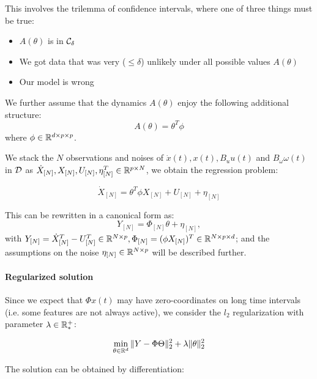 \documentclass{article}
\begin{document}
This involves the trilemma of confidence intervals, where one of three things must be true:
\begin{itemize}
    \item $A(\theta)$ is in $\mathcal{C}_\delta$
    \item We got data that was very ($\leq\delta$) unlikely under all possible values $A(\theta)$
    \item Our model is wrong
\end{itemize}

\begin{assumption}
\label{assum:linear_param}
We further assume that the dynamics $A(\theta)$ enjoy the following additional structure:
\begin{equation}
    A(\theta) = \theta^T \phi
\end{equation}
where $\phi\in \mathbb{R}^{d \times p \times p}$.
\end{assumption}

We stack the $N$ observations and noises of $\dot{x}(t), x(t), B_u u(t)$ and $B_\omega \omega(t)$ in $\mathcal{D}$ as $\dot{X}_{[N]}, X_{[N]}, U_{[N]}, \eta_{[N]}^T \in\mathbb{R}^{p\times N}$, we obtain the regression problem: 

\[\dot{X}_{[N]} = \theta^T\phi X_{[N]} + U_{[N]} + \eta_{[N]}\]

This can be rewritten in a canonical form as:
\begin{equation}
    \label{eq:regression}
    Y_{[N]} = \Phi_{[N]} \theta + \eta_{[N]},
\end{equation}
with $Y_{[N]} = \dot{X}_{[N]}^T - U_{[N]}^T  \in\mathbb{R}^{N\times p}, \Phi_{[N]} = (\phi X_{[N]})^T\in \mathbb{R}^{N\times p\times d}$; and the assumptions on the noise $\eta_{[N]} \in\mathbb{R}^{N\times p}$ will be described further.

\paragraph{Regularized solution} Since we expect that $\Phi x(t)$ may have zero-coordinates on long time intervals (i.e. some features are not always active), we consider the $l_2$ regularization with parameter $\lambda\in\mathbb{R}^+_*$:

\begin{equation*}
    \min_{\theta\in\mathbb{R}^d} \|Y - \Phi \Theta\|_2^2 + \lambda\|\theta\|_2^2
\end{equation*}

The solution can be obtained by differentiation:
\end{document}
